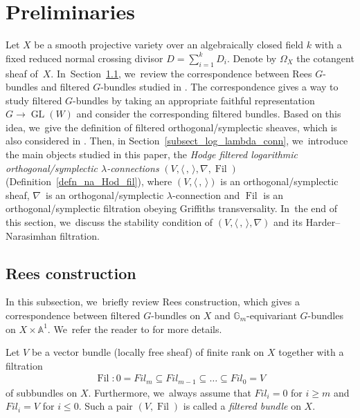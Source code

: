 \documentclass[JEP,XML,SOM,Unicode,published]{cedram}
\newcommand{\Fil}{\textit{Fil}}
\newcommand{\lconnection}{$\lambda$\nobreakdash-con\-nec\-tion\xspace}
\newcommand{\lconnections}{$\lambda$\nobreakdash-con\-nec\-tions\xspace}
\DeclareMathOperator{\Filt}{Fil}
\DeclareMathOperator{\GL}{GL}
\theoremstyle{plain}
\theoremstyle{definition}
\begin{document}
\section{Preliminaries}\label{sect_pre}

Let $X$ be a smooth projective variety over an algebraically closed field $k$ with a fixed reduced normal crossing divisor $D=\sum_{i=1}^{k}D_i$. Denote by $\Omega_X$ the cotangent sheaf of~$X$. In~Section~\ref{subsect_rees}, we~review the correspondence between Rees $G$-bundles and filtered $G$-bundles studied in \cite{Lo17a,Lo17b}. The correspondence gives a way to study filtered $G$-bundles by taking an appropriate faithful representation $G \to \GL(W)$ and consider the corresponding filtered bundles. Based on this idea, we~give the definition of filtered orthogonal/symplectic sheaves, which is also considered in \hbox{\cite[\S5]{GS03}}. Then, in Section~\ref{subsect_log_lambda_conn}, we~introduce the main objects studied in this paper, the \emph{Hodge filtered logarithmic orthogonal/symplectic \lconnections} $(V, \langle \,, \, \rangle, \nabla, \Filt)$ (Definition~\ref{defn_na_Hod_fil}), where $(V, \langle \,, \, \rangle)$ is an orthogonal/symplectic sheaf, $\nabla$~is an orthogonal/symplectic \lconnection and $\Filt$ is an orthogonal/symplectic filtration obeying Griffiths transversality. In~the end of this section, we~discuss the stability condition of $(V, \langle \,, \, \rangle, \nabla)$ and its Harder--Narasimhan filtration.

\subsection{Rees construction}\label{subsect_rees}
In this subsection, we~briefly review Rees construction, which gives a correspondence between filtered $G$-bundles on $X$ and $\mathbb{G}_m$-equivariant $G$-bundles on $X \times \mathbb{A}^1$. We~refer the reader to \cite{L13,Lo17a,Lo17b} for more details.

Let $V$ be a vector bundle (locally free sheaf) of finite rank on $X$ together with a filtration
\begin{align*}
\Filt: 0 = \Fil_m \subseteq \Fil_{m-1} \subseteq \dots \subseteq \Fil_0 = V
\end{align*}
of subbundles on $X$. Furthermore, we~always assume that $\Fil_i =0$ for $i \geq m$ and $\Fil_i = V$ for $i \leq 0$. Such a pair $(V,\Filt)$ is called a \emph{filtered bundle} on $X$.
\end{document}
